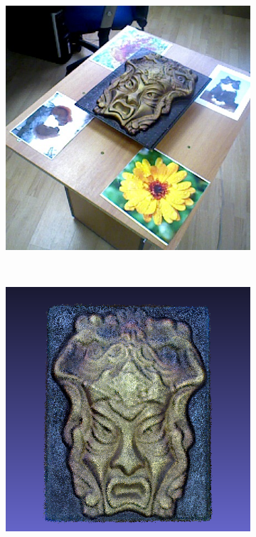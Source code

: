 \documentclass[letterpaper, 10 pt, conference]{ieeeconf}  %
\begin{document}
\begin{figure}[t]
	\centering
        \begin{subfigure}[b]{0.45\linewidth}
                \centering
                \includegraphics[width=\linewidth]{../models/gorgon_train.jpg}
                \caption{}
        \end{subfigure}%
        ~ %
        \begin{subfigure}[b]{0.45\linewidth}
                \centering
                \includegraphics[width=\linewidth]{../models/gorgon_color_model.png}
                \caption{}
        \end{subfigure}


\end{figure}
\end{document}
